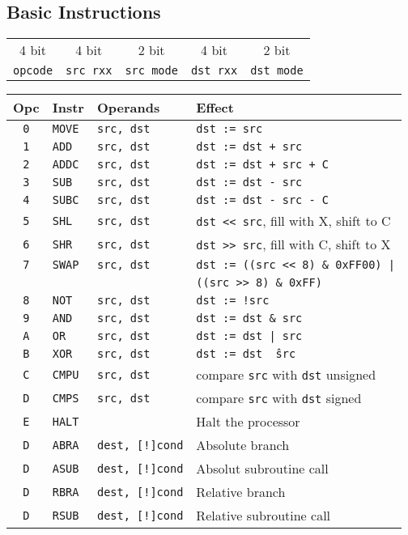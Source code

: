 \documentclass{leaflet}
\begin{document}
  \subsection{Basic Instructions}
   \begin{center}
    \begin{longtable}{|c||c|c||c|c|}
     \hline
     4 bit&4 bit&2 bit&4 bit&2 bit\\
     {\tt opcode}&{\tt src rxx}&{\tt src mode}&
     {\tt dst rxx}&{\tt dst mode}\\
     \hline
    \end{longtable}
   \end{center}
   {\scriptsize
    \begin{center}
     \begin{longtable}{|c|ll|l|}
      \hline
       Opc&Instr&Operands&Effect\\
      \hline
      \hline
       {\tt 0}&{\tt MOVE}&{\tt src, dst}&{\tt dst := src}\\
       {\tt 1}&{\tt ADD}&{\tt src, dst}&{\tt dst := dst + src}\\
       {\tt 2}&{\tt ADDC}&{\tt src, dst}&{\tt dst := dst + src + C}\\
       {\tt 3}&{\tt SUB}&{\tt src, dst}&{\tt dst := dst - src}\\
       {\tt 4}&{\tt SUBC}&{\tt src, dst}&{\tt dst := dst - src - C}\\
       {\tt 5}&{\tt SHL}&{\tt src, dst}&{\tt dst << src}, fill with X, shift to C\\
       {\tt 6}&{\tt SHR}&{\tt src, dst}&{\tt dst >> src}, fill with C, shift to X\\
       {\tt 7}&{\tt SWAP}&{\tt src, dst}&{\tt dst := ((src << 8) \& 0xFF00) |}\\
              &          &              &{\tt ((src >> 8) \& 0xFF)}\\
       {\tt 8}&{\tt NOT}&{\tt src, dst}&{\tt dst := !src}\\
       {\tt 9}&{\tt AND}&{\tt src, dst}&{\tt dst := dst \& src}\\
       {\tt A}&{\tt OR}&{\tt src, dst}&{\tt dst := dst | src}\\
       {\tt B}&{\tt XOR}&{\tt src, dst}&{\tt dst := dst \^\ src}\\
       {\tt C}&{\tt CMPU}&{\tt src, dst}&compare {\tt src} with {\tt dst} unsigned\\
       {\tt D}&{\tt CMPS}&{\tt src, dst}&compare {\tt src} with {\tt dst} signed\\
       {\tt E}&{\tt HALT}&&Halt the processor\\
       {\tt D}&{\tt ABRA}&{\tt dest, [!]cond}&Absolute branch\\
       {\tt D}&{\tt ASUB}&{\tt dest, [!]cond}&Absolut subroutine call\\
       {\tt D}&{\tt RBRA}&{\tt dest, [!]cond}&Relative branch\\
       {\tt D}&{\tt RSUB}&{\tt dest, [!]cond}&Relative subroutine call\\
      \hline
     \end{longtable}
    \end{center}
   }
%
\end{document}
